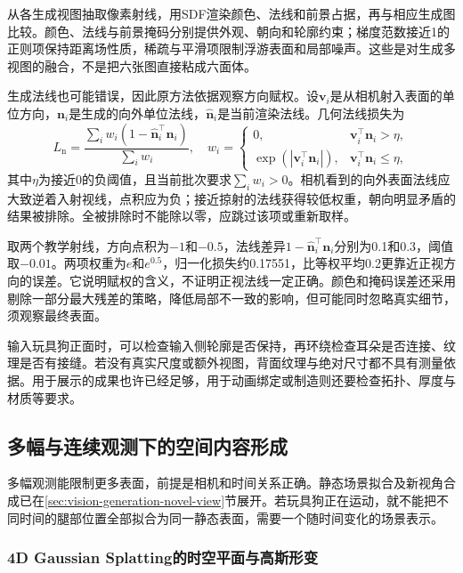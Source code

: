 从各生成视图抽取像素射线，用SDF渲染颜色、法线和前景占据，再与相应生成图比较。颜色、法线与前景掩码分别提供外观、朝向和轮廓约束；梯度范数接近1的正则项保持距离场性质，稀疏与平滑项限制浮游表面和局部噪声。这些是对生成多视图的融合，不是把六张图直接粘成六面体。

生成法线也可能错误，因此原方法依据观察方向赋权。设$\bm v_i$是从相机射入表面的单位方向，$\bm n_i$是生成的向外单位法线，$\widehat{\bm n}_i$是当前渲染法线。几何法线损失为
\begin{equation}
 L_{\mathrm n}
 =\frac{\sum_i w_i(1-\widehat{\bm n}_i^\top\bm n_i)}
         {\sum_i w_i},
 \quad
 w_i=
 \begin{cases}
  0,&\bm v_i^\top\bm n_i>\eta,\\
  \exp(|\bm v_i^\top\bm n_i|),&\bm v_i^\top\bm n_i\leq\eta,
 \end{cases}
 \label{eq:vision-wonder-normal}
\end{equation}
其中$\eta$为接近0的负阈值，且当前批次要求$\sum_iw_i>0$。相机看到的向外表面法线应大致逆着入射视线，点积应为负；接近掠射的法线获得较低权重，朝向明显矛盾的结果被排除。全被排除时不能除以零，应跳过该项或重新取样。

取两个教学射线，方向点积为$-1$和$-0.5$，法线差异$1-\widehat{\bm n}_i^\top\bm n_i$分别为0.1和0.3，阈值取$-0.01$。两项权重为$e$和$e^{0.5}$，归一化损失约0.17551，比等权平均0.2更靠近正视方向的误差。它说明赋权的含义，不证明正视法线一定正确。颜色和掩码误差还采用剔除一部分最大残差的策略，降低局部不一致的影响，但可能同时忽略真实细节，须观察最终表面。

输入玩具狗正面时，可以检查输入侧轮廓是否保持，再环绕检查耳朵是否连接、纹理是否有接缝。若没有真实尺度或额外视图，背面纹理与绝对尺寸都不具有测量依据。用于展示的成果也许已经足够，用于动画绑定或制造则还要检查拓扑、厚度与材质等要求。

\subsection{多幅与连续观测下的空间内容形成}
\label{sec:vision-multigen-observed-space}

多幅观测能限制更多表面，前提是相机和时间关系正确。静态场景拟合及新视角合成已在\ref{sec:vision-generation-novel-view}节展开。若玩具狗正在运动，就不能把不同时间的腿部位置全部拟合为同一静态表面，需要一个随时间变化的场景表示。

\subsubsection{4D Gaussian Splatting的时空平面与高斯形变}
\label{sec:vision-multigen-4dgs}

